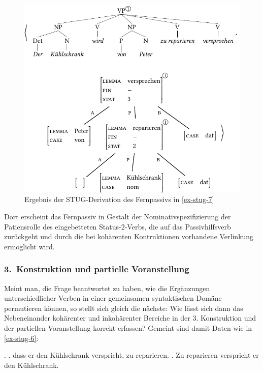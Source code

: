 \begin{figure}[t]
\centering
\includegraphics{graphics/abb910.pdf}
\caption{\label{fig-stug-12} Ergebnis der STUG-Derivation des Fernpassivs in \ref{ex-stug-7}}
\end{figure}
Dort erscheint das Fernpassiv in Gestalt der Nominativspezifizierung der Patiensrolle des eingebetteten Status-2-Verbs, die auf das Passivhilfsverb zurückgeht und durch die bei kohärenten Kontruktionen vorhandene Verlinkung ermöglicht wird. 

\subsubsection*{3.\ Konstruktion und partielle Voranstellung}

Meint man, die Frage beantwortet zu haben, wie die Ergänzungen unterschiedlicher Verben in einer gemeinsamen syntaktischen Domäne permutieren können, so stellt sich gleich die nächste: Wie lässt sich dann das Nebeneinander kohärenter und inkohärenter Bereiche in der 3. Konstruktion und der partiellen Voranstellung korrekt erfassen? Gemeint sind damit Daten wie in \ref{ex-stug-6}:

\ex. \label{ex-stug-6}
\a. \label{ex-stug-6-a} dass er den Kühlschrank verspricht, zu reparieren.
\b. \label{ex-stug-6-b} Zu reparieren verspricht er den Kühlschrank.

